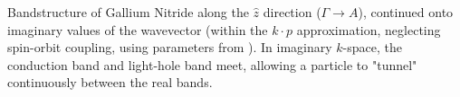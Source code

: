 Bandstructure of Gallium Nitride along the $\hat{z}$ direction ($\Gamma\rightarrow A$), continued onto imaginary values of the wavevector (within the $k\cdot p$ approximation, neglecting spin-orbit coupling, using parameters from \cite{Rinke_2008}).  In imaginary $k$-space, the conduction band and light-hole band meet, allowing a particle to "tunnel" continuously between the real bands.